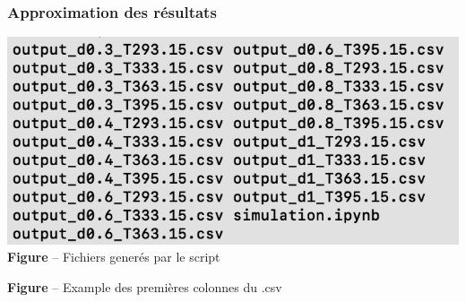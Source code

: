 \documentclass{beamer}
\begin{document}
\begin{frame}
\frametitle{Approximation des résultats}
\centering
\begin{minipage}{0.48\textwidth}
    \centering
    \includegraphics[width=\linewidth]{Fig/stefan-fichiers.png}
    \textbf{Figure} -- Fichiers generés par le script
\end{minipage}
\hfill
\begin{minipage}{0.48\textwidth}
    \centering
        
        \textbf{Figure} -- Example des premières colonnes du .csv
\end{minipage}     

\end{frame}
\end{document}
